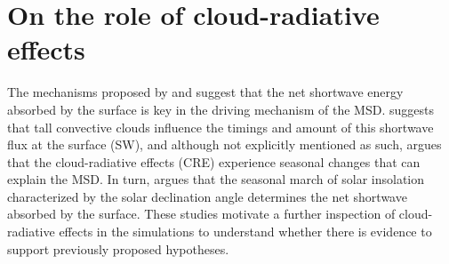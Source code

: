 



% 

\section{On the role of cloud-radiative effects}


The mechanisms proposed by \cite{magana1999} and \cite{karnauskas2013} suggest that the net shortwave energy absorbed by the surface is key in the driving mechanism of the MSD. \cite{magana1999} suggests that tall convective clouds influence the timings and amount of this shortwave flux at the surface (SW), and although not explicitly mentioned as such, \cite{magana1999} argues that the cloud-radiative effects (CRE) experience seasonal changes that can explain the MSD. In turn, \cite{karnauskas2013} argues that the seasonal march of solar insolation characterized by the solar declination angle determines the net shortwave absorbed by the surface. These studies motivate a further inspection of cloud-radiative effects in the simulations to understand whether there is evidence to support previously proposed hypotheses.


